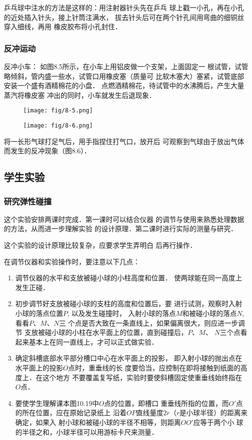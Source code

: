 乒乓球中注水的方法是这样的：用注射器针头先在乒乓
球上戳一小孔，再在小孔的近处插入针头，接上针筒注满水，
拔去针头后可在两个针孔间用弯曲的细铜丝穿入细线，再用
橡皮胶布将小孔封住．

\subsubsection{反冲运动}
反冲小车：
如图8.5所示，在小车上用铝皮做一个支架，上面固定一
根试管，试管略倾斜，管内盛一些水，试管口用橡皮塞（质量可
比软木塞大）塞紧，试管底部安装一个盛有酒精棉花的小盘．
点燃酒精棉花，待试管中的水沸腾后，产生大量蒸汽将橡皮塞
冲出的同时，小车就发生后退现象．

\begin{figure}[htp]\centering
    \begin{minipage}[t]{0.48\textwidth}
    \centering
\texttt{[image: fig/8-5.png]}
    \caption{}
    \end{minipage}
    \begin{minipage}[t]{0.48\textwidth}
    \centering
\texttt{[image: fig/8-6.png]}
    \caption{}
    \end{minipage}
    \end{figure}

将一长形气球打足气后，用手指捏住打气口，放开后
可观察到气球由于放出气体而发生的反冲现象（图8.6）．

\subsection{学生实验}
\subsubsection{研究弹性碰撞}
这个实验安排两课时完成．第一课时可以结合仪器
的调节与使用来熟悉处理数据的方法，从而进一步理解实验
的设计原理．第二课时进行实际的测量与研究．

这个实验的设计原理比较复杂，应要求学生弄明白
后再行操作．

在调节仪器和实验操作时，要注意以下几点：
\begin{enumerate}
    \item 调节仪器的水平和支放被碰小球的小柱高度和位置．
使两球能在同一高度上发生正碰．
\item 初步调节好支放被碰小球的支柱的高度和位置后，要
进行试测，观察时入射小球的落点位置$P$, 以及发生碰撞时，
入射小球的落点$M$和被碰小球的落点$N$, 看看$P$、$M$、$N$三
个点是否大致在一条直线上，如果偏离很大，则应进一步调节
支放被碰小球的小柱在水平面上的位置，直到碰撞后，$P$、$M$、
$N$三个点看起来基本上在同一直线上，才可以正式做实验．
\item 确定斜槽底部水平部分槽口中心在水平面上的投影，
即入射小球的抛出点在水平面上的投影$O$点时，重垂线的长
度要恰当，应控制在即将接触到纸面的高度上．在这个地方
不要覆盖复写纸，实验时要使斜槽固定使重垂线始终指在
$O$点．
\item 要使学生理解课本图10.19中$O$点的位置，即槽口
重垂线所指的位置，而$O'$点的所在位置，应在原始记录纸上
沿着$OP$直线量度$2r$（$r$是小球半径）的距离来确定，如果入
射小球和被碰小球的半径不相等，则距离$OO'$应等于两个小
球的半径之和，小球半径可以用游标卡尺来测量．
\end{enumerate}

